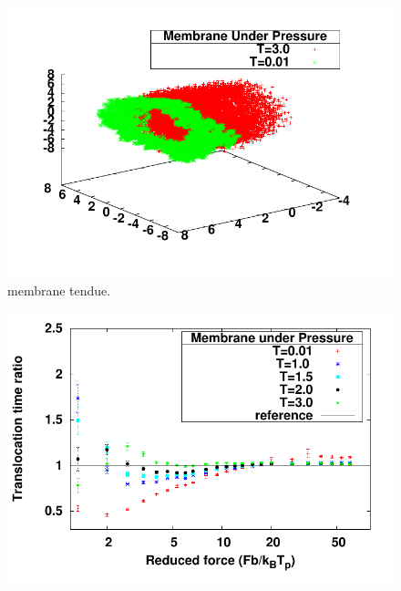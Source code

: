 \begin{figure}[H]
\begin{center}
\includegraphics[width=\textwidth]{3dmembranepressure.pdf}  

\caption[Membrane sous pression]{membrane tendue.}
\label{reducedpore}
\end{center}
\end{figure}

\begin{figure}[H]
\begin{center}
\includegraphics[width=1\textwidth]{lowtension.pdf} 
\label{membranepressionevoltemp}
\end{center}
\end{figure}


